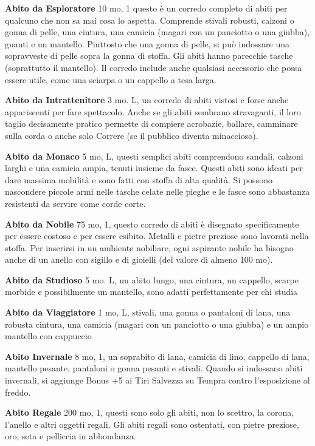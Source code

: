 \documentclass[a4paper,11pt,twoside,openany]{book}
\begin{document}
\textbf{Abito da Esploratore} 10 mo, 1 questo è un corredo completo di abiti per qualcuno che non sa mai cosa lo aspetta. Comprende stivali robusti, calzoni o gonna di pelle, una cintura, una camicia (magari con un panciotto o una giubba), guanti e un mantello.
Piuttosto che una gonna di pelle, si può indossare una sopravveste di pelle sopra la gonna di stoffa. Gli abiti hanno parecchie tasche (soprattutto il mantello). Il corredo include anche qualsiasi accessorio che possa essere utile, come una sciarpa o un cappello a tesa larga.

\textbf{Abito da Intrattenitore} 3 mo. L,  un corredo di abiti vistosi e forse anche appariscenti per fare spettacolo. Anche se gli abiti sembrano stravaganti, il loro taglio decisamente pratico permette di compiere acrobazie, ballare, camminare sulla corda o anche solo Correre (se il pubblico diventa minaccioso).

\textbf{Abito da Monaco} 5 mo, L, questi semplici abiti comprendono sandali, calzoni larghi e una camicia ampia, tenuti insieme da fasce. Questi abiti sono ideati per dare massima mobilità e sono fatti con stoffa di alta qualità. Si possono nascondere piccole armi nelle tasche celate nelle pieghe e le fasce sono abbastanza resistenti da servire come corde corte.

\textbf{Abito da Nobile} 75 mo, 1, questo corredo di abiti è disegnato specificamente per essere costoso e per essere esibito. Metalli e pietre preziose sono lavorati nella stoffa. Per inserirsi in un ambiente nobiliare, ogni aspirante nobile ha bisogno anche di un anello con sigillo e di gioielli (del valore di almeno 100 mo).

\textbf{Abito da Studioso} 5 mo. L, un abito lungo, una cintura, un cappello, scarpe morbide e possibilmente un mantello, sono adatti perfettamente per chi studia

\textbf{Abito da Viaggiatore} 1 mo, L, stivali, una gonna o pantaloni di lana, una robusta cintura, una camicia (magari con un panciotto o una giubba) e un ampio mantello con cappuccio

\textbf{Abito Invernale} 8 mo, 1, un soprabito di lana, camicia di lino, cappello di lana, mantello pesante, pantaloni o gonna pesanti e stivali. Quando si indossano abiti invernali, si aggiunge Bonus +5 ai Tiri Salvezza su Tempra contro l'esposizione al freddo.

\textbf{Abito Regale} 200 mo, 1,  questi sono solo gli abiti, non lo scettro, la corona, l'anello e altri oggetti regali. Gli abiti regali sono ostentati, con pietre preziose, oro, seta e pelliccia in abbondanza.
\end{document}
